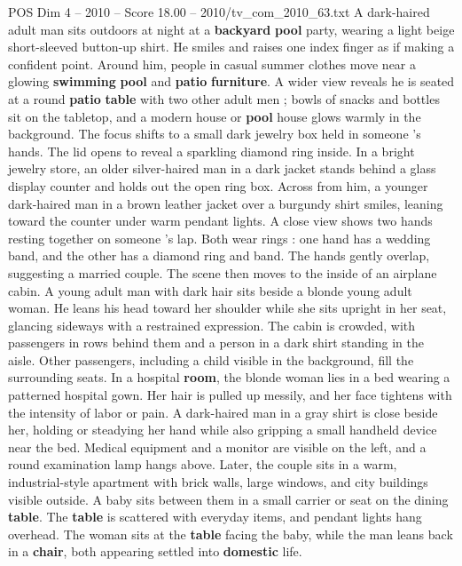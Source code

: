 \begin{textsample}{POS Dim 4 – 2010 – Score 18.00 – 2010/tv\_com\_2010\_63.txt}  \label{ex:f4_pos_025}
A dark-haired adult man sits outdoors at night at a \textbf{backyard} \textbf{pool} party, wearing a light beige short-sleeved button-up shirt.
He smiles and raises one index finger as if making a confident point.
Around him, people in casual summer clothes move near a glowing \textbf{swimming} \textbf{pool} and \textbf{patio} \textbf{furniture}.
A wider view reveals he is seated at a round \textbf{patio} \textbf{table} with two other adult men ; bowls of snacks and bottles sit on the tabletop, and a modern house or \textbf{pool} house glows warmly in the background.
The focus shifts to a small dark jewelry box held in someone ’s hands.
The lid opens to reveal a sparkling diamond ring inside.
In a bright jewelry store, an older silver-haired man in a dark jacket stands behind a glass display counter and holds out the open ring box.
Across from him, a younger dark-haired man in a brown leather jacket over a burgundy shirt smiles, leaning toward the counter under warm pendant lights.
A close view shows two hands resting together on someone ’s lap.
Both wear rings : one hand has a wedding band, and the other has a diamond ring and band.
The hands gently overlap, suggesting a married couple.
The scene then moves to the inside of an airplane cabin.
A young adult man with dark hair sits beside a blonde young adult woman.
He leans his head toward her shoulder while she sits upright in her seat, glancing sideways with a restrained expression.
The cabin is crowded, with passengers in rows behind them and a person in a dark shirt standing in the aisle.
Other passengers, including a child visible in the background, fill the surrounding seats.
In a hospital \textbf{room}, the blonde woman lies in a bed wearing a patterned hospital gown.
Her hair is pulled up messily, and her face tightens with the intensity of labor or pain.
A dark-haired man in a gray shirt is close beside her, holding or steadying her hand while also gripping a small handheld device near the bed.
Medical equipment and a monitor are visible on the left, and a round examination lamp hangs above.
Later, the couple sits in a warm, industrial-style apartment with brick walls, large windows, and city buildings visible outside.
A baby sits between them in a small carrier or seat on the dining \textbf{table}.
The \textbf{table} is scattered with everyday items, and pendant lights hang overhead.
The woman sits at the \textbf{table} facing the baby, while the man leans back in a \textbf{chair}, both appearing settled into \textbf{domestic} life.

\end{textsample}
